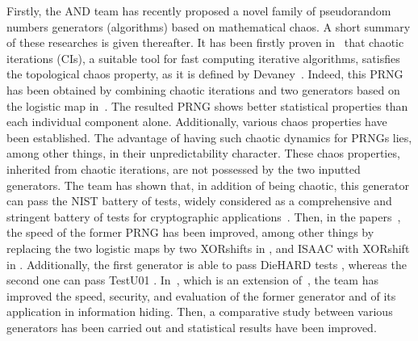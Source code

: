 Firstly, the AND team has recently proposed a novel family of pseudorandom numbers generators (algorithms) 
based on mathematical chaos.
A short summary of these researches is given thereafter.
It has been firstly proven in~\cite{guyeux09,guyeux10} that chaotic iterations (CIs), a suitable tool for fast computing iterative algorithms, satisfies the topological chaos property, as it is defined by Devaney~\cite{Dev89}. Indeed, this PRNG has been obtained by combining chaotic iterations and two generators based on the logistic map in~\cite{wang2009}. The resulted PRNG shows better statistical properties than each individual component alone. Additionally, various chaos properties have been established. 
The advantage of having such chaotic dynamics for PRNGs lies, among other things, in their unpredictability character. These chaos properties, inherited from chaotic iterations, are not possessed by the two inputted generators. 
The team has shown that, in addition of being chaotic, this generator can pass the NIST battery of tests, widely considered as a comprehensive and stringent battery of tests for cryptographic applications~\cite{ANDREW2008}.
Then, in the papers~\cite{guyeuxTaiwan10,bgw10:ip}, the speed of the former PRNG has been improved,
among other things by replacing the two logistic maps by two XORshifts in \cite{guyeuxTaiwan10}, and ISAAC with XORshift in \cite{bgw10:ip}. Additionally, the first generator is able to pass DieHARD tests \cite{guyeuxTaiwan10}, whereas the second one can pass TestU01 \cite{bgw10:ip}.
In~\cite{wbg10:ip,bfgw11:ij}, which is an extension of~\cite{wang2009}, the team has improved the speed, security, and evaluation of the former generator and of its application in information hiding. Then, a comparative study between various generators has been carried out and statistical results have been improved. %

